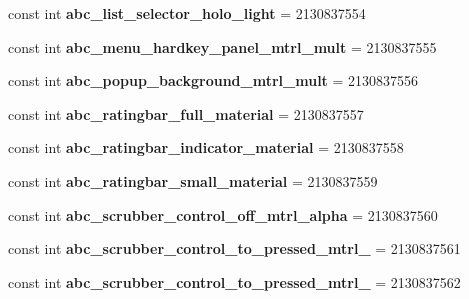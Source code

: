 \begin{DoxyCompactItemize}
const int {\bfseries abc\+\_\+list\+\_\+selector\+\_\+holo\+\_\+light} = 2130837554
\item 
\mbox{\label{classXaria_1_1Resource_1_1Drawable_afc2f0c69ac7ac01b924cb4ac735a47b2}} 
const int {\bfseries abc\+\_\+menu\+\_\+hardkey\+\_\+panel\+\_\+mtrl\+\_\+mult} = 2130837555
\item 
\mbox{\label{classXaria_1_1Resource_1_1Drawable_aa67afe03b95705e3e280e66cf7a44574}} 
const int {\bfseries abc\+\_\+popup\+\_\+background\+\_\+mtrl\+\_\+mult} = 2130837556
\item 
\mbox{\label{classXaria_1_1Resource_1_1Drawable_a1c664141ff807c640ae21aa4c913f538}} 
const int {\bfseries abc\+\_\+ratingbar\+\_\+full\+\_\+material} = 2130837557
\item 
\mbox{\label{classXaria_1_1Resource_1_1Drawable_a3de9ed08fd62f4457009338e258910e6}} 
const int {\bfseries abc\+\_\+ratingbar\+\_\+indicator\+\_\+material} = 2130837558
\item 
\mbox{\label{classXaria_1_1Resource_1_1Drawable_af2660d0b30b726a462755cf638203b95}} 
const int {\bfseries abc\+\_\+ratingbar\+\_\+small\+\_\+material} = 2130837559
\item 
\mbox{\label{classXaria_1_1Resource_1_1Drawable_ab3aceb2523a23113688052648fa83086}} 
const int {\bfseries abc\+\_\+scrubber\+\_\+control\+\_\+off\+\_\+mtrl\+\_\+alpha} = 2130837560
\item 
\mbox{\label{classXaria_1_1Resource_1_1Drawable_aab3c40a6584f740404d7da063828574e}} 
const int {\bfseries abc\+\_\+scrubber\+\_\+control\+\_\+to\+\_\+pressed\+\_\+mtrl\+\_} = 2130837561
\item 
\mbox{\label{classXaria_1_1Resource_1_1Drawable_ad842b6d55eff2f9e624081576b4a4cd2}} 
const int {\bfseries abc\+\_\+scrubber\+\_\+control\+\_\+to\+\_\+pressed\+\_\+mtrl\+\_} = 2130837562
\item 
\mbox{\label{classXaria_1_1Resource_1_1Drawable_adacff60d1bd7f20251781ae7f848de99}} 

\end{DoxyCompactItemize}
